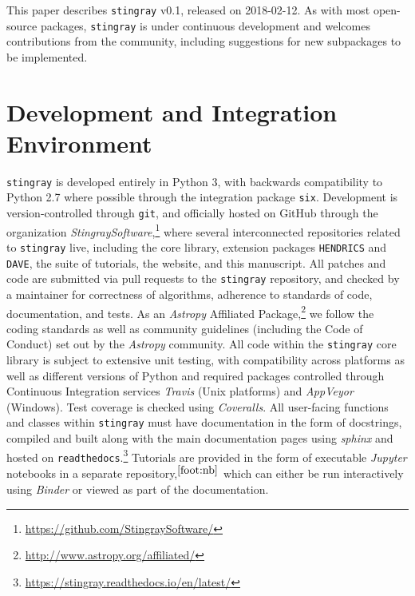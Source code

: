 \documentclass[twocolumn]{aastex62}
\newcommand{\stingray}{\texttt{stingray}\xspace}
\newcommand{\hendrics}{\texttt{HENDRICS}\xspace}
\begin{document}
This paper describes \stingray v0.1, released on 2018-02-12. 
As with most open-source packages, \stingray is under continuous development and welcomes contributions from the community, including suggestions for new subpackages to be implemented.


\section{Development and Integration Environment}
\label{sec:development}

\stingray is developed entirely in Python 3, with backwards compatibility to Python 2.7 where possible through the integration package \texttt{six}. 
Development is version-controlled through \texttt{git}, and officially hosted on GitHub through the organization \textit{StingraySoftware},\footnote{\url{https://github.com/StingraySoftware/}} where several interconnected repositories related to \stingray live, including the core library, extension packages \hendrics and \texttt{DAVE}, the suite of tutorials, the website, and this manuscript. 
All patches and code are submitted via pull requests to the \stingray repository, and checked by a maintainer for correctness of algorithms, adherence to standards of code, documentation, and tests. 
As an \textit{Astropy} Affiliated Package,\footnote{\url{http://www.astropy.org/affiliated/}} we follow the coding standards as well as community guidelines (including the Code of Conduct) set out by the \textit{Astropy} community. 
All code within the \stingray core library is subject to extensive unit testing, with compatibility across platforms as well as different versions of Python and required packages controlled through Continuous Integration services \textit{Travis} (Unix platforms) and \textit{AppVeyor} (Windows). 
Test coverage is checked using \textit{Coveralls}. 
All user-facing functions and classes within \stingray must have documentation in the form of docstrings, compiled and built along with the main documentation pages using \textit{sphinx} and hosted on \texttt{readthedocs}.\footnote{\url{https://stingray.readthedocs.io/en/latest/}}
Tutorials are provided in the form of executable \textit{Jupyter} notebooks in a separate repository,$^{\ref{foot:nb}}$ which can either be run interactively using \textit{Binder} \citep{project_jupyter-proc-scipy-2018} or viewed as part of the documentation. 
\end{document}
